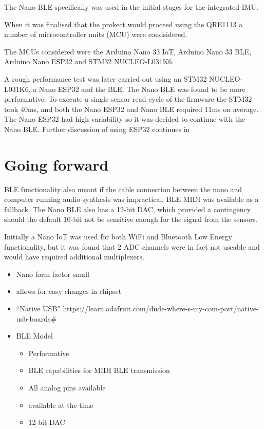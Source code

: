 The Nano BLE specifically was used in the initial stages for the
integrated IMU.

When it was finalised that the prokect would proceed using the QRE1113 a
number of microcontroller units (MCU) were condsidered.

The MCUs considered were the Arduino Nano 33 IoT, Arduino Nano 33 BLE,
Arduino Nano ESP32 and STM32 NUCLEO-L031K6.

A rough performance test was later carried out using an STM32
NUCLEO-L031K6, a Nano ESP32 and the BLE. The Nano BLE was found to be
more performative. To execute a single sensor read cycle of the firmware
the STM32 took 40ms, and both the Nano ESP32 and Nano BLE required 11ms
on average. The Nano ESP32 had high variability so it was decided to
continue with the Nano BLE. Further discussion of using ESP32 continues
in

\section{Going forward}

BLE functionality also meant if the cable connection between the nano
and computer running audio synthesis was impractical, BLE MIDI was
available as a fallback. The Nano BLE also has a 12-bit DAC, which
provided a contingency should the default 10-bit not be sensitive enough
for the signal from the sensors.

Initially a Nano IoT was used for both WiFi and Bluetooth Low Energy
functionality, but it was found that 2 ADC channels were in fact not
useable and would have required additional multiplexers.

\begin{itemize}
\tightlist
\item
  Nano form factor small
\item
  allows for easy changes in chipset
\item
  ``Native USB''
  https://learn.adafruit.com/dude-where-s-my-com-port/native-usb-boards\#
\item
  BLE Model

  \begin{itemize}
  \tightlist
  \item
    Performative
  \item
    BLE capabilities for MIDI BLE transmission
  \item
    All analog pins available
  \item
    available at the time
  \item
    12-bit DAC
  \end{itemize}
\end{itemize}

